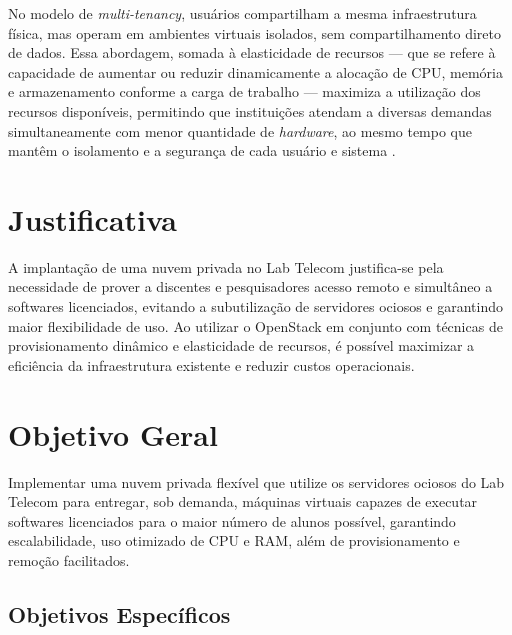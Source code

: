 No modelo de \textit{multi-tenancy}, usuários compartilham a mesma infraestrutura física, mas operam em ambientes virtuais isolados, sem compartilhamento direto de dados. Essa abordagem, somada à elasticidade de recursos — que se refere à capacidade de aumentar ou reduzir dinamicamente a alocação de CPU, memória e armazenamento conforme a carga de trabalho — maximiza a utilização dos recursos disponíveis, permitindo que instituições atendam a diversas demandas simultaneamente com menor quantidade de \textit{hardware}, ao mesmo tempo que mantêm o isolamento e a segurança de cada usuário e sistema \cite{heuchert2021}.

\section{Justificativa}

A implantação de uma nuvem privada no Lab Telecom justifica-se pela necessidade de prover a discentes e pesquisadores acesso remoto e simultâneo a softwares licenciados, evitando a subutilização de servidores ociosos e garantindo maior flexibilidade de uso. Ao utilizar o OpenStack em conjunto com técnicas de provisionamento dinâmico e elasticidade de recursos, é possível maximizar a eficiência da infraestrutura existente e reduzir custos operacionais.

\section{Objetivo Geral}

Implementar uma nuvem privada flexível que utilize os servidores ociosos do Lab Telecom para entregar, sob demanda, máquinas virtuais capazes de executar softwares licenciados para o maior número de alunos possível, garantindo escalabilidade, uso otimizado de CPU e RAM, além de provisionamento e remoção facilitados.

\subsection{Objetivos Específicos}

